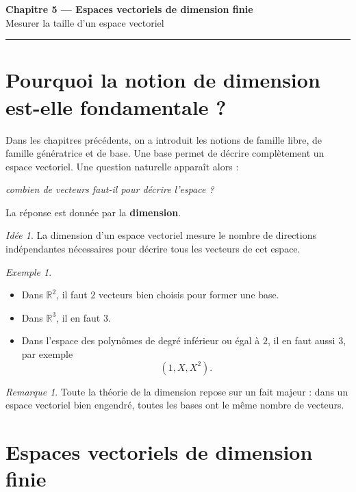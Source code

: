 \documentclass[11pt,a4paper]{article}
\theoremstyle{remark}
\newtheorem{remarque}[definition]{Remarque}
\newtheorem{exemple}[definition]{Exemple}
\newtheorem*{idee}{Idée}
\newcommand{\R}{\mathbb{R}}
\begin{document}
\begin{center}
    {\LARGE \textbf{Chapitre 5 --- Espaces vectoriels de dimension finie}}\\[0.5em]
    {\large Mesurer la taille d’un espace vectoriel}
\end{center}

\hrule
\vspace{1em}

\tableofcontents

\newpage

\section{Pourquoi la notion de dimension est-elle fondamentale ?}

Dans les chapitres précédents, on a introduit les notions de famille libre, de famille génératrice et de base. Une base permet de décrire complètement un espace vectoriel. Une question naturelle apparaît alors :

\begin{center}
\textit{combien de vecteurs faut-il pour décrire l’espace ?}
\end{center}

La réponse est donnée par la \textbf{dimension}.

\begin{idee}
La dimension d’un espace vectoriel mesure le nombre de directions indépendantes nécessaires pour décrire tous les vecteurs de cet espace.
\end{idee}

\begin{exemple}
\begin{itemize}
    \item Dans \(\R^2\), il faut \(2\) vecteurs bien choisis pour former une base.
    \item Dans \(\R^3\), il en faut \(3\).
    \item Dans l’espace des polynômes de degré inférieur ou égal à \(2\), il en faut aussi \(3\), par exemple
    \[
    (1,X,X^2).
    \]
\end{itemize}
\end{exemple}

\begin{remarque}
Toute la théorie de la dimension repose sur un fait majeur : dans un espace vectoriel bien engendré, toutes les bases ont le même nombre de vecteurs.
\end{remarque}

\section{Espaces vectoriels de dimension finie}
\end{document}
